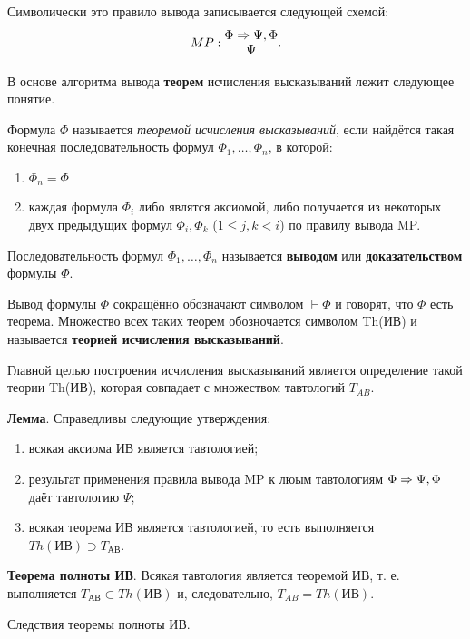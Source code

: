 Символически это правило вывода записывается следующей схемой:
\begin{equation*}
    MP: \begin{matrix}
        \Phi \Rightarrow \Psi, \Phi \\
        \Psi
    \end{matrix}.
\end{equation*}

В основе алгоритма вывода \textbf{теорем} исчисления высказываний лежит следующее понятие.

\dftion Формула $\Phi$ называется \textit{теоремой исчисления высказываний}, если найдётся такая конечная последовательность формул $\Phi_1, \dots, \Phi_n$, в которой:
\begin{enumerate}
    \item $\Phi_n = \Phi$
    \item каждая формула $\Phi_i$ либо являтся аксиомой, либо получается из некоторых двух предыдущих формул $\Phi_i, \Phi_k$ ($1 \leq j, k < i$) по правилу вывода MP.
\end{enumerate}

Последовательность формул $\Phi_1, \dots, \Phi_n$ называется \textbf{выводом} или \textbf{доказательством} формулы $\Phi$.

\dftion Вывод формулы $\Phi$ сокращённо обозначают символом $\vdash \Phi$ и говорят, что $\Phi$ есть теорема. Множество всех таких теорем обозночается символом Th(ИВ) и называется \textbf{теорией исчисления высказываний}.

Главной целью построения исчисления высказываний является определение такой теории Th(ИВ), которая совпадает с множеством тавтологий $T_{AB}$.

\textbf{Лемма}.
Справедливы следующие утверждения:
\begin{enumerate}
    \item всякая аксиома ИВ является тавтологией;
    \item результат применения правила вывода MP к люым тавтологиям $\Phi \Rightarrow \Psi, \Phi$ даёт тавтологию $\Psi$;
    \item всякая теорема ИВ является тавтологией, то есть выполняется $Th(\text{ИВ}) \supset T_{\text{АВ}}$.
\end{enumerate}

\textbf{Теорема полноты ИВ}.
Всякая тавтология является теоремой ИВ, т. е. выполняется $T_\text{АВ} \subset Th(\text{ИВ})$ и, следовательно, $T_{AB}=Th(\text{ИВ})$.

Следствия теоремы полноты ИВ.

